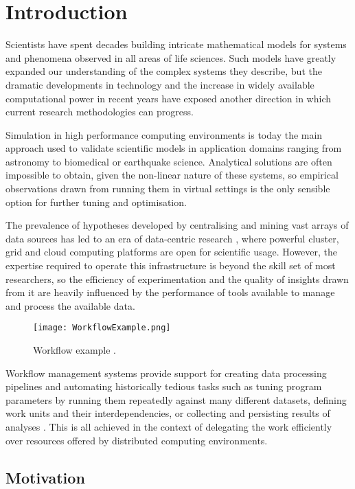\chapter{Introduction}

Scientists have spent decades building intricate mathematical models for systems and phenomena observed in all areas of life sciences. Such models have greatly expanded our understanding of the complex systems they describe, but the dramatic developments in technology and the increase in widely available computational power in recent years have exposed another direction in which current research methodologies can progress.

Simulation in high performance computing environments is today the main approach used to validate scientific models in application domains ranging from astronomy to biomedical or earthquake science. Analytical solutions are often impossible to obtain, given the non-linear nature of these systems, so empirical observations drawn from running them in virtual settings is the only sensible option for further tuning and optimisation.

The prevalence of hypotheses developed by centralising and mining vast arrays of data sources has led to an era of data-centric research \cite{Goble2009}, where powerful cluster, grid and cloud computing platforms are open for scientific usage. However, the expertise required to operate this infrastructure is beyond the skill set of most researchers, so the efficiency of experimentation and the quality of insights drawn from it are heavily influenced by the performance of tools available to manage and process the available data.

\begin{figure}[h]
	\centering
		\texttt{[image: WorkflowExample.png]}
	\caption{Workflow example \cite{Curcin2008}.}
	\label{WorkflowExample}
\end{figure}

Workflow management systems provide support for creating data processing pipelines and automating historically tedious tasks such as tuning program parameters by running them repeatedly against many different datasets, defining work units and their interdependencies, or collecting and persisting results of analyses \cite{Goble2009, Taylor2007}. This is all achieved in the context of delegating the work efficiently over resources offered by distributed computing environments.

\section{Motivation}

